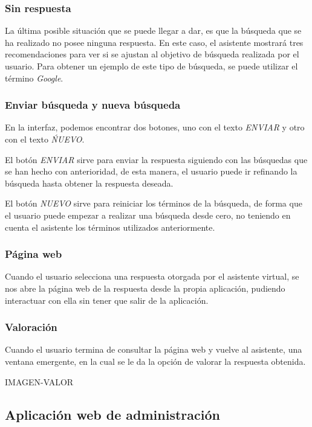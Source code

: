 \newpage

\subsubsection{Sin respuesta}

La última posible situación que se puede llegar a dar, es que la búsqueda que se ha realizado no posee ninguna respuesta. En este caso, el asistente mostrará tres recomendaciones para ver si se ajustan al objetivo de búsqueda realizada por el usuario. Para obtener un ejemplo de este tipo de búsqueda, se puede utilizar el término \textit{Google}.


\subsubsection{Enviar búsqueda y nueva búsqueda}

En la interfaz, podemos encontrar dos botones, uno con el texto \textit{ENVIAR} y otro con el texto \textit{ŃUEVO}.

El botón \textit{ENVIAR} sirve para enviar la respuesta siguiendo con las búsquedas que se han hecho con anterioridad, de esta manera, el usuario puede ir refinando la búsqueda hasta obtener la respuesta deseada.


El botón \textit{NUEVO} sirve para reiniciar los términos de la búsqueda, de forma que el usuario puede empezar a realizar una búsqueda desde cero, no teniendo en cuenta el asistente los términos utilizados anteriormente.


\subsubsection{Página web}

Cuando el usuario selecciona una respuesta otorgada por el asistente virtual, se nos abre la página web de la respuesta desde la propia aplicación, pudiendo interactuar con ella sin tener que salir de la aplicación.


\subsubsection{Valoración}

Cuando el usuario termina de consultar la página web y vuelve al asistente, una ventana emergente, en la cual se le da la opción de valorar la respuesta obtenida.

IMAGEN-VALOR

\subsection{Aplicación web de administración}

